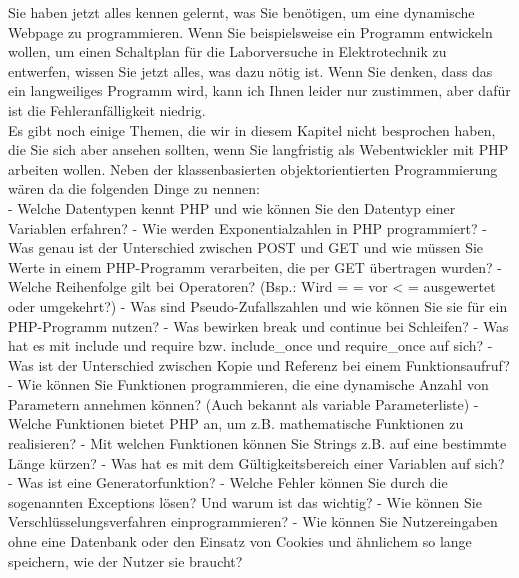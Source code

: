 Sie haben jetzt alles kennen gelernt, was Sie benötigen, um eine dynamische Webpage zu programmieren. Wenn Sie beispielsweise ein Programm entwickeln wollen, um einen Schaltplan für die Laborversuche in Elektrotechnik zu entwerfen, wissen Sie jetzt alles, was dazu nötig ist. Wenn Sie denken, dass das ein langweiliges Programm wird, kann ich Ihnen leider nur zustimmen, aber dafür ist die Fehleranfälligkeit niedrig.\\

Es gibt noch einige Themen, die wir in diesem Kapitel nicht besprochen haben, die Sie sich aber ansehen sollten, wenn Sie langfristig als Webentwickler mit PHP arbeiten wollen. Neben der klassenbasierten objektorientierten Programmierung wären da die folgenden Dinge zu nennen:\\

-	Welche Datentypen kennt PHP und wie können Sie den Datentyp einer Variablen erfahren?
-	Wie werden Exponentialzahlen in PHP programmiert?
-	Was genau ist der Unterschied zwischen POST und GET und wie müssen Sie Werte in einem PHP-Programm verarbeiten, die per GET übertragen wurden?
-	Welche Reihenfolge gilt bei Operatoren? (Bsp.: Wird = = vor < = ausgewertet oder umgekehrt?)
-	Was sind Pseudo-Zufallszahlen und wie können Sie sie für ein PHP-Programm nutzen?
-	Was bewirken break und continue bei Schleifen?
-	Was hat es mit include und require bzw. include\_once und require\_once auf sich?
-	Was ist der Unterschied zwischen Kopie und Referenz bei einem Funktionsaufruf?
-	Wie können Sie Funktionen programmieren, die eine dynamische Anzahl von Parametern annehmen können? (Auch bekannt als variable Parameterliste)
-	Welche Funktionen bietet PHP an, um z.B. mathematische Funktionen zu realisieren?
-	Mit welchen Funktionen können Sie Strings z.B. auf eine bestimmte Länge kürzen?
-	Was hat es mit dem Gültigkeitsbereich einer Variablen auf sich?
-	Was ist eine Generatorfunktion?
-	Welche Fehler können Sie durch die sogenannten Exceptions lösen? Und warum ist das wichtig?
-	Wie können Sie Verschlüsselungsverfahren einprogrammieren?
-	Wie können Sie Nutzereingaben ohne eine Datenbank oder den Einsatz von Cookies und ähnlichem so lange speichern, wie der Nutzer sie braucht? 

